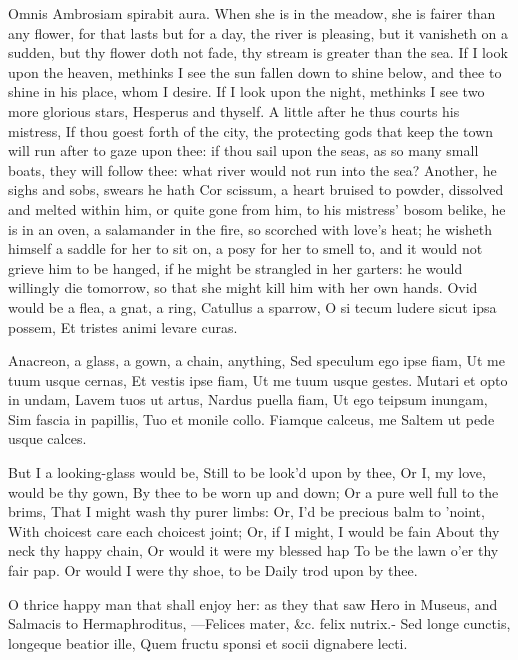 {Omnis Ambrosiam spirabit aura. When she is in the meadow, she is
fairer than any flower, for that lasts but for a day, the river is
pleasing, but it vanisheth on a sudden, but thy flower doth not fade,
thy stream is greater than the sea. If I look upon the heaven, methinks
I see the sun fallen down to shine below, and thee to shine in his
place, whom I desire. If I look upon the night, methinks I see two more
glorious stars, Hesperus and thyself. A little after he thus courts his
mistress,  If thou goest forth of the city, the protecting gods
that keep the town will run after to gaze upon thee: if thou sail upon
the seas, as so many small boats, they will follow thee: what river
would not run into the sea? Another, he sighs and sobs, swears he hath
Cor scissum, a heart bruised to powder, dissolved and melted within
him, or quite gone from him, to his mistress' bosom belike, he is in an
oven, a salamander in the fire, so scorched with love's heat; he
wisheth himself a saddle for her to sit on, a posy for her to smell to,
and it would not grieve him to be hanged, if he might be strangled in
her garters: he would willingly die tomorrow, so that she might kill
him with her own hands. Ovid would be a flea, a gnat, a ring,
Catullus a sparrow,
O si tecum ludere sicut ipsa possem,
Et tristes animi levare curas.

Anacreon, a glass, a gown, a chain, anything,
Sed speculum ego ipse fiam,
Ut me tuum usque cernas,
Et vestis ipse fiam,
Ut me tuum usque gestes.
Mutari et opto in undam,
Lavem tuos ut artus,
Nardus puella fiam,
Ut ego teipsum inungam,
Sim fascia in papillis,
Tuo et monile collo.
Fiamque calceus, me
Saltem ut pede usque calces.

But I a looking-glass would be,
Still to be look'd upon by thee,
Or I, my love, would be thy gown,
By thee to be worn up and down;
Or a pure well full to the brims,
That I might wash thy purer limbs:
Or, I'd be precious balm to 'noint,
With choicest care each choicest joint;
Or, if I might, I would be fain
About thy neck thy happy chain,
Or would it were my blessed hap
To be the lawn o'er thy fair pap.
Or would I were thy shoe, to be
Daily trod upon by thee.

O thrice happy man that shall enjoy her: as they that saw Hero in
Museus, and Salmacis to Hermaphroditus,
---Felices mater, \&c. felix nutrix.-
Sed longe cunctis, longeque beatior ille,
Quem fructu sponsi et socii dignabere lecti.

}

